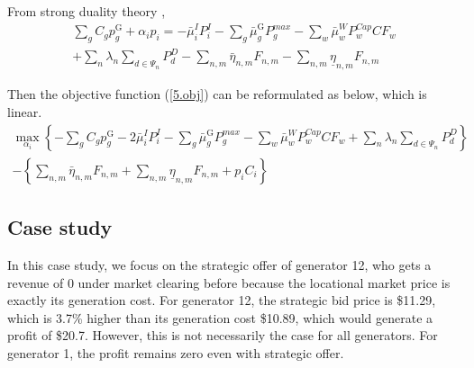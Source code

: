 From strong duality theory \cite{Gabriel2013}, 
\begin{equation}
\begin{split}
  \sum_g C_{g} p_{g}^{\mathrm{G}} + \alpha_i p_i = -\bar{\mu}_i^I P_i^I -\sum_{g}\bar{\mu}_{g}^{\mathrm{G}}P_g^{max} - \sum_w\bar{\mu}_w^W P_w^{Cap}CF_w \\+ \sum_n\lambda_n\sum_{d \in \Psi_n}P_d^D  - \sum_{n, m} \bar{\eta}_{n, m} F_{n,m} -\sum_{n, m} \underline{\eta}_{n, m} F_{n,m}
  \end{split}
\end{equation}

Then the objective function (\ref{5.obj}) can be reformulated as below, which is linear.
\begin{equation}
\begin{split}
    \underset{\alpha_i}{\max}\left\{ 
     -\sum_g C_{g} p_{g}^{\mathrm{G}}  -2\bar{\mu}_i^I P_i^I -\sum_{g}\bar{\mu}_{g}^{\mathrm{G}}P_g^{max} - \sum_w\bar{\mu}_w^W P_w^{Cap}CF_w + \sum_n\lambda_n\sum_{d \in \Psi_n}P_d^D  \right \} \\-\left\{ \sum_{n, m} \bar{\eta}_{n, m} F_{n,m} +\sum_{n, m} \underline{\eta}_{n, m} F_{n,m} + p_i C_i
    \right \}
    \end{split}
\end{equation}
\subsection{Case study}
In this case study, we focus on the strategic offer of generator 12, who gets a revenue of 0 under market clearing before because the locational market price is exactly its generation cost. For generator 12, the strategic bid price is \$11.29, which is 3.7\% higher than its generation cost \$10.89, which would generate a profit of \$20.7. However, this is not necessarily the case for all generators. For generator 1, the profit remains zero even with strategic offer.